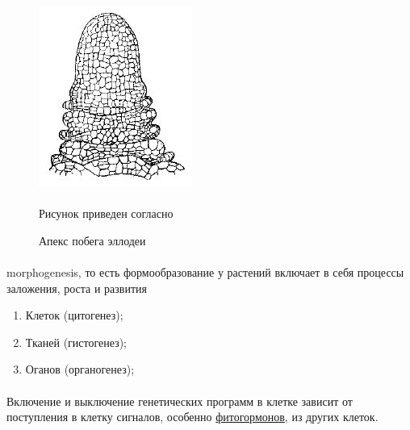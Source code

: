 \begin{figure}[h!]
  \centering
       \includegraphics[width=0.3\linewidth]{pictures/apex}
\caption{Апекс побега эллодеи}
\paragraph*{}Рисунок приведен согласно \cite{korovkin_2007}
\label{apex}
\end{figure}


\paragraph*{}\gls{morphogenesis}, то есть формообразование у растений включает в себя процессы заложения, роста и развития

\begin{enumerate}
	\item Клеток (цитогенез);
	\item Тканей (гистогенез);
	\item Оганов (органогенез);
\end{enumerate}


\paragraph*{}Включение и выключение генетических программ в клетке зависит от поступления в клетку сигналов, особенно \hyperlink{gormons}{фитогормонов}, из других клеток. 

